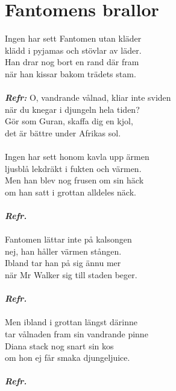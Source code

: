\section{Fantomens brallor}
Ingen har sett Fantomen utan kläder\\
klädd i pyjamas och stövlar av läder.\\
Han drar nog bort en rand där fram\\
när han kissar bakom trädets stam.\\
\\
\textbf{\textit{Refr:}}
O, vandrande vålnad, kliar inte sviden\\
när du knegar i djungeln hela tiden?\\
Gör som Guran, skaffa dig en kjol,\\
det är bättre under Afrikas sol.\\
\\
Ingen har sett honom kavla upp ärmen\\
ljusblå lekdräkt i fukten och värmen.\\
Men han blev nog frusen om sin häck\\
om han satt i grottan alldeles näck.\\
\\
\textbf{\textit{Refr.}}\\
\\
Fantomen lättar inte på kalsongen\\
nej, han håller värmen stången.\\
Ibland tar han på sig ännu mer\\
när Mr Walker sig till staden beger.\\
\\
\textbf{\textit{Refr.}}\\
\\
Men ibland i grottan längst därinne\\
tar vålnaden fram sin vandrande pinne\\
Diana stack nog snart sin kos\\
om hon ej får smaka djungeljuice.\\
\\
\textbf{\textit{Refr.}}

